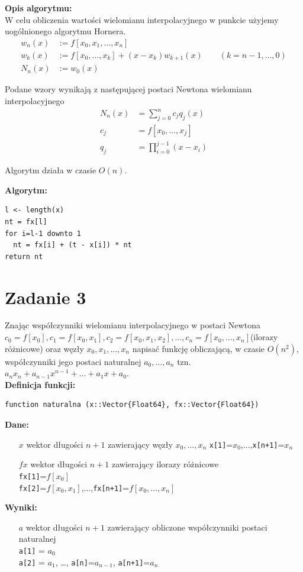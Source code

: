 \documentclass[12pt]{article}
\begin{document}
\noindent \textbf{Opis algorytmu:}\\
W celu obliczenia wartości wielomianu interpolacyjnego w punkcie użyjemy uogólnionego algorytmu Hornera.
\begin{align*}
	w_n(x) &:= f[x_0, x_1, \ldots, x_n] \\
	w_k(x) &:= f[x_0, \ldots, x_k] + (x - x_k)w_{k+1}(x) \qquad (k = n-1, \ldots, 0) \\
	N_n(x) &:= w_0(x)
\end{align*}

\noindent Podane wzory wynikają z następującej postaci Newtona wielomianu interpolacyjnego 
\begin{align*}
N_n(x) &= \sum_{j=0}^n c_jq_j(x) \\
c_j &= f[x_0, \ldots, x_j] \\
q_j &= \prod_{i=0}^{j-1} (x-x_i)
\end{align*}

\noindent Algorytm działa w czasie $O(n)$.

\noindent \textbf{Algorytm:}
\begin{verbatim}
l <- length(x)
nt = fx[l]
for i=l-1 downto 1
  nt = fx[i] + (t - x[i]) * nt
return nt
\end{verbatim}

\clearpage

\section{Zadanie 3}
Znając współczynniki wielomianu interpolacyjnego w postaci Newtona $c_0=f[x_0], c_1=f[x_0, x_1], c_2=f[x_0, x_1, x_2], \ldots ,c_n=f[x_0, \ldots , x_n]$(ilorazy różnicowe) oraz węzły $x_0, x_1, \ldots , x_n$ napisać funkcję obliczającą, w czasie $O(n^2)$, współczynniki jego postaci naturalnej $a_0, \ldots , a_n$ tzn. $a_nx_n+a_{n-1}x^{n-1}+ \ldots +a_1x+a_0$.\\
\textbf{Definicja funkcji:}
\begin{verbatim}
function naturalna (x::Vector{Float64}, fx::Vector{Float64})
\end{verbatim}

\noindent \textbf{Dane:}
\begin{itemize}[leftmargin=4.0cm,labelsep=0.4cm]
\item[$x$] wektor długości $n + 1$ zawierający węzły $x_0, ..., x_n$ \texttt{x[1]}=$x_0$,...,\texttt{x[n+1]}=$x_n$
\item[$fx$] wektor długości $n+1$ zawierający ilorazy różnicowe \\
\texttt{fx[1]}=$f[x_0]$\\
\texttt{fx[2]}=$f[x_0, x_1]$,...,\texttt{fx[n+1]}=$f[x_0,...,x_n]$
\end{itemize}
\textbf{Wyniki:} 
\begin{itemize}[leftmargin=4.0cm,labelsep=0.4cm]
\item[$a$] wektor długości $n + 1$ zawierający obliczone współczynniki postaci naturalnej \\
\texttt{a[1]} = $a_0$\\
\texttt{a[2]} = $a_1$, \ldots, \texttt{a[n]}=$a_{n-1}$, \texttt{a[n+1]}=$a_n$
\end{itemize}
\end{document}
